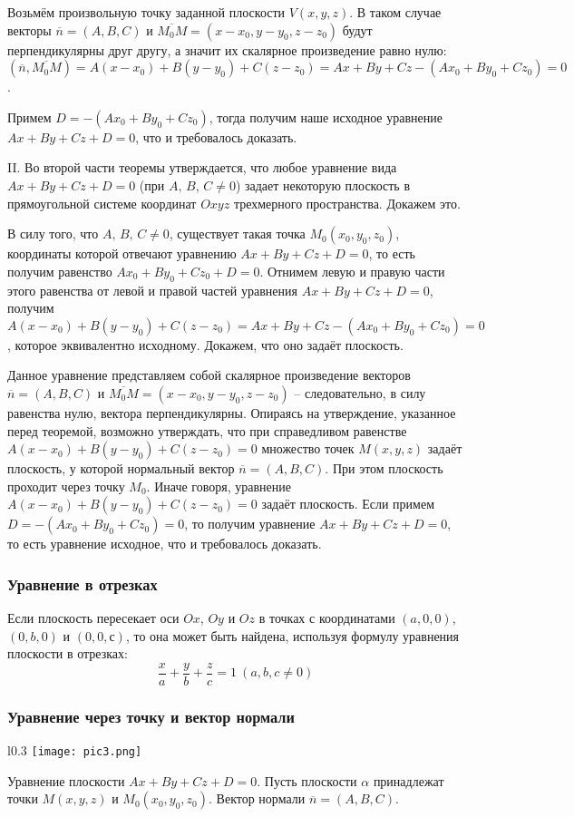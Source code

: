 \documentclass{article}
\begin{document}
Возьмём произвольную точку заданной плоскости $V(x,y,z)$. В таком случае векторы $\overline{n}=(A,B,C)$ и $\overline{M_0M}=(x-x_0,y-y_0,z-z_0)$ будут перпендикулярны друг другу, а значит их скалярное произведение равно нулю: $(\overline{n},\overline{M_0M})=A(x-x_0)+B(y-y_0)+C(z-z_0)=Ax+By+Cz-(Ax_0+By_0+Cz_0)=0$.

Примем $D=-(Ax_0+By_0+Cz_0)$, тогда получим наше исходное уравнение $Ax+By+Cz+D=0$, что и требовалось доказать.

\newpage

II. Во второй части теоремы утверждается, что любое уравнение вида $Ax+By+Cz+D=0$ (при $A,\,B,\,C\neq 0$)
 задает некоторую плоскость в прямоугольной системе координат $Oxyz$
 трехмерного пространства. Докажем это.

В силу того, что $A,\,B,\,C\neq 0$, существует такая точка $M_0(x_0,y_0,z_0)$, координаты которой отвечают уравнению $Ax+By+Cz+D=0$, то есть получим равенство $Ax_0+By_0+Cz_0+D=0$. Отнимем левую и правую части этого равенства от левой и правой частей уравнения $Ax+By+Cz+D=0$, получим $A(x-x_0)+B(y-y_0)+C(z-z_0)=Ax+By+Cz-(Ax_0+By_0+Cz_0)=0$, которое эквивалентно исходному. Докажем, что оно задаёт плоскость.

Данное уравнение представляем собой скалярное произведение векторов $\overline{n}=(A,B,C)$ и $\overline{M_0M}=(x-x_0,y-y_0,z-z_0)$ -- следовательно, в силу равенства нулю, вектора перпендикулярны. Опираясь на утверждение, указанное перед теоремой, возможно утверждать, что при справедливом равенстве $A(x-x_0)+B(y-y_0)+C(z-z_0)=0$ множество точек $M(x,y,z)$ задаёт плоскость, у которой нормальный вектор $\overline{n}=(A,B,C)$. При этом плоскость проходит через точку $M_0$. Иначе говоря, уравнение $A(x-x_0)+B(y-y_0)+C(z-z_0)=0$ задаёт плоскость. Если примем $D=-(Ax_0+By_0+Cz_0)=0$, то получим уравнение $Ax+By+Cz+D=0$, то есть уравнение исходное, что и требовалось доказать.
\subsubsection{Уравнение в отрезках}
Если плоскость пересекает оси $Ox$, $Oy$ и $Oz$ в точках с координатами $(a, 0, 0)$, $(0, b, 0)$ и $(0, 0, с)$, то она может быть найдена, используя формулу уравнения плоскости в отрезках:
$$ \frac{x}{a}+\frac{y}{b}+\frac{z}{c}=1\:(a,b,c\neq0) $$
\subsubsection{Уравнение через точку и вектор нормали}
\begin{wrapfigure}{l}{0.3\textwidth}
    \centering
    \texttt{[image: pic3.png]}
\end{wrapfigure}
Уравнение плоскости $Ax+By+Cz+D=0$. Пусть плоскости $\alpha$ принадлежат точки $M(x,y,z)$ и $M_0(x_0,y_0,z_0)$. Вектор нормали $\overline{n}=(A,B,C)$.
\end{document}
